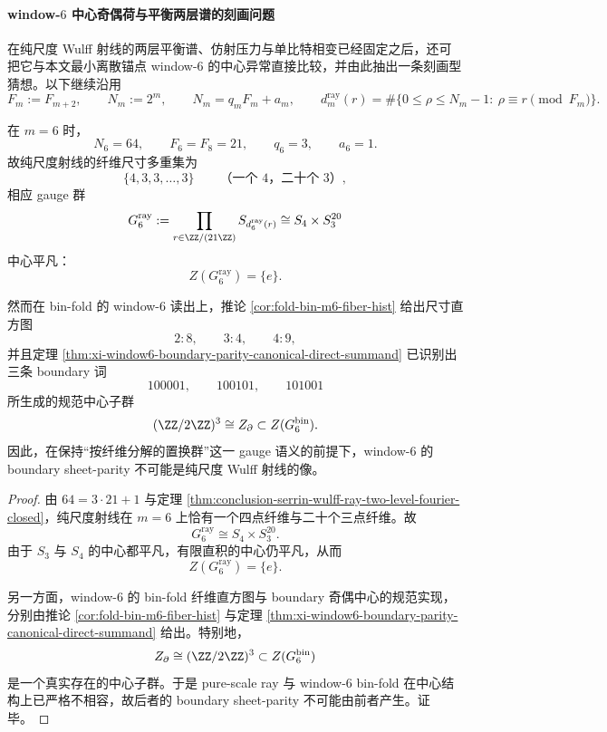 \paragraph{window-\texorpdfstring{$6$}{6} 中心奇偶荷与平衡两层谱的刻画问题}
在纯尺度 Wulff 射线的两层平衡谱、仿射压力与单比特相变已经固定之后，还可把它与本文最小离散锚点 window-\(6\) 的中心异常直接比较，并由此抽出一条刻画型猜想。以下继续沿用
\[
F_m:=F_{m+2},
\qquad
N_m:=2^m,
\qquad
N_m=q_mF_m+a_m,
\qquad
d_m^{\mathrm{ray}}(r)=\#\{0\le \rho\le N_m-1:\ \rho\equiv r\!\!\pmod{F_m}\}.
\]

\begin{theorem}\label{thm:conclusion-serrin-wulff-ray-window6-center-parity-incompatibility}
在 \(m=6\) 时，
\[
N_6=64,
\qquad
F_6=F_8=21,
\qquad
q_6=3,
\qquad
a_6=1.
\]
故纯尺度射线的纤维尺寸多重集为
\[
\{4,3,3,\dots,3\}
\qquad
\text{（一个 \(4\)，二十个 \(3\)）},
\]
相应 gauge 群
\[
G_6^{\mathrm{ray}}
:=
\prod_{r\in \ZZ/(21\ZZ)}S_{d_6^{\mathrm{ray}}(r)}
\cong
S_4\times S_3^{20}
\]
中心平凡：
\[
Z(G_6^{\mathrm{ray}})=\{e\}.
\]

然而在 bin-fold 的 window-\(6\) 读出上，推论 \ref{cor:fold-bin-m6-fiber-hist} 给出尺寸直方图
\[
2:8,\qquad 3:4,\qquad 4:9,
\]
并且定理 \ref{thm:xi-window6-boundary-parity-canonical-direct-summand} 已识别出三条 boundary 词
\[
100001,\qquad 100101,\qquad 101001
\]
所生成的规范中心子群
\[
(\ZZ/2\ZZ)^3\cong Z_{\partial}\subset Z(G_6^{\mathrm{bin}}).
\]
因此，在保持“按纤维分解的置换群”这一 gauge 语义的前提下，window-\(6\) 的 boundary sheet-parity 不可能是纯尺度 Wulff 射线的像。
\end{theorem}
\begin{proof}
由 \(64=3\cdot 21+1\) 与定理 \ref{thm:conclusion-serrin-wulff-ray-two-level-fourier-closed}，纯尺度射线在 \(m=6\) 上恰有一个四点纤维与二十个三点纤维。故
\[
G_6^{\mathrm{ray}}
\cong
S_4\times S_3^{20}.
\]
由于 \(S_3\) 与 \(S_4\) 的中心都平凡，有限直积的中心仍平凡，从而
\[
Z(G_6^{\mathrm{ray}})=\{e\}.
\]

另一方面，window-\(6\) 的 bin-fold 纤维直方图与 boundary 奇偶中心的规范实现，分别由推论 \ref{cor:fold-bin-m6-fiber-hist} 与定理 \ref{thm:xi-window6-boundary-parity-canonical-direct-summand} 给出。特别地，
\[
Z_{\partial}\cong (\ZZ/2\ZZ)^3\subset Z(G_6^{\mathrm{bin}})
\]
是一个真实存在的中心子群。于是 pure-scale ray 与 window-\(6\) bin-fold 在中心结构上已严格不相容，故后者的 boundary sheet-parity 不可能由前者产生。证毕。
\end{proof}

